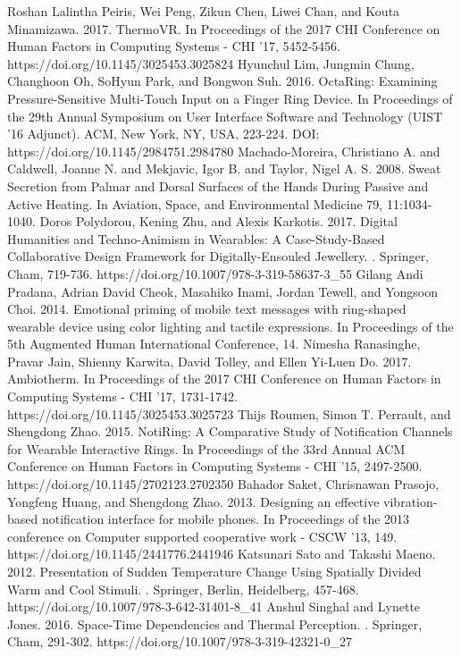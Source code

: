 \documentclass[preprint,12pt]{elsarticle}
\begin{document}
\begin{thebibliography}{00}
Roshan Lalintha Peiris, Wei Peng, Zikun Chen, Liwei Chan, and Kouta Minamizawa. 2017. ThermoVR. In Proceedings of the 2017 CHI Conference on Human Factors in Computing Systems - CHI '17, 5452-5456. https://doi.org/10.1145/3025453.3025824
Hyunchul Lim, Jungmin Chung, Changhoon Oh, SoHyun Park, and Bongwon Suh. 2016. OctaRing: Examining Pressure-Sensitive Multi-Touch Input on a Finger Ring Device. In Proceedings of the 29th Annual Symposium on User Interface Software and Technology (UIST '16 Adjunct). ACM, New York, NY, USA, 223-224. DOI: https://doi.org/10.1145/2984751.2984780
Machado-Moreira, Christiano A. and Caldwell, Joanne N. and Mekjavic, Igor B. and Taylor, Nigel A. S. 2008. Sweat Secretion from Palmar and Dorsal Surfaces of the Hands During Passive and Active Heating. In Aviation, Space, and Environmental Medicine 79, 11:1034-1040.
Doros Polydorou, Kening Zhu, and Alexis Karkotis. 2017. Digital Humanities and Techno-Animism in Wearables: A Case-Study-Based Collaborative Design Framework for Digitally-Ensouled Jewellery. . Springer, Cham, 719-736. https://doi.org/10.1007/978-3-319-58637-3\_55
Gilang Andi Pradana, Adrian David Cheok, Masahiko Inami, Jordan Tewell, and Yongsoon Choi. 2014. Emotional priming of mobile text messages with ring-shaped wearable device using color lighting and tactile expressions. In Proceedings of the 5th Augmented Human International Conference, 14.
Nimesha Ranasinghe, Pravar Jain, Shienny Karwita, David Tolley, and Ellen Yi-Luen Do. 2017. Ambiotherm. In Proceedings of the 2017 CHI Conference on Human Factors in Computing Systems - CHI '17, 1731-1742. https://doi.org/10.1145/3025453.3025723
Thijs Roumen, Simon T. Perrault, and Shengdong Zhao. 2015. NotiRing: A Comparative Study of Notification Channels for Wearable Interactive Rings. In Proceedings of the 33rd Annual ACM Conference on Human Factors in Computing Systems - CHI '15, 2497-2500. https://doi.org/10.1145/2702123.2702350
Bahador Saket, Chrisnawan Prasojo, Yongfeng Huang, and Shengdong Zhao. 2013. Designing an effective vibration-based notification interface for mobile phones. In Proceedings of the 2013 conference on Computer supported cooperative work - CSCW '13, 149. https://doi.org/10.1145/2441776.2441946
Katsunari Sato and Takashi Maeno. 2012. Presentation of Sudden Temperature Change Using Spatially Divided Warm and Cool Stimuli. . Springer, Berlin, Heidelberg, 457-468. https://doi.org/10.1007/978-3-642-31401-8\_41
Anshul Singhal and Lynette Jones. 2016. Space-Time Dependencies and Thermal Perception. . Springer, Cham, 291-302. https://doi.org/10.1007/978-3-319-42321-0\_27

\end{thebibliography}
\end{document}
